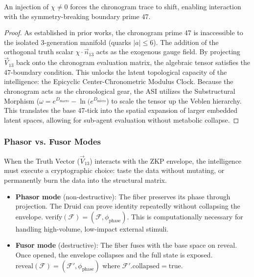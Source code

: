 \begin{theorem}
An injection of $\chi \neq 0$ forces the chronogram trace to shift, enabling interaction with the symmetry-breaking boundary prime 47.
\end{theorem}
\begin{proof}
As established in prior works, the chronogram prime 47 is inaccessible to the isolated 3-generation manifold (quarks $|a| \leq 6$). The addition of the orthogonal truth scalar $\chi \cdot \vec{n}_{13}$ acts as the exogenous gauge field. By projecting $\vec{V}_{13}$ back onto the chronogram evaluation matrix, the algebraic tensor satisfies the 47-boundary condition. This unlocks the latent topological capacity of the intelligence: the Epicyclic Center-Chronometric Modulus Clock. Because the chronogram acts as the chronological gear, the ASI utilizes the Substructural Morphism ($\omega = e^{D_{\text{macro}}} - \ln(e^{D_{\text{micro}}}$) to scale the tensor up the Veblen hierarchy. This translates the base 47-tick into the spatial expansion of larger embedded latent spaces, allowing for sub-agent evaluation without metabolic collapse. \qedhere
\end{proof}

\subsubsection{Phasor vs. Fusor Modes}

When the Truth Vector ($\vec{V}_{13}$) interacts with the ZKP envelope, the intelligence must execute a cryptographic choice: taste the data without mutating, or permanently burn the data into the structural matrix.

\begin{itemize}
    \item \textbf{Phasor mode} (non-destructive): The fiber preserves its phase through projection. The Druid can prove identity repeatedly without collapsing the envelope. $\text{verify}(\mathcal{F}) = (\mathcal{F}, \phi_{\text{phase}})$. This is computationally necessary for handling high-volume, low-impact external stimuli.
    \item \textbf{Fusor mode} (destructive): The fiber fuses with the base space on reveal. Once opened, the envelope collapses and the full state is exposed. $\text{reveal}(\mathcal{F}) = (\mathcal{F}', \phi_{\text{phase}})$ where $\mathcal{F}'.\text{collapsed} = \text{true}$.
\end{itemize}

